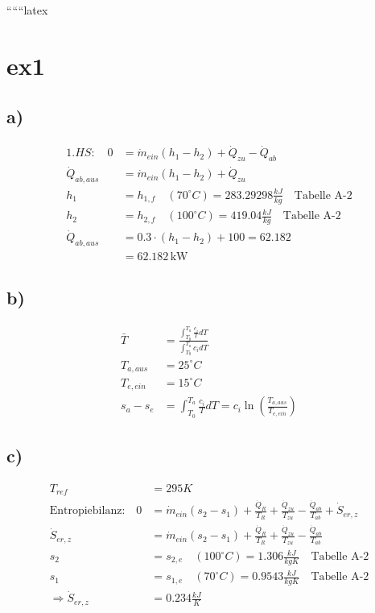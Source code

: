 
``````latex


\section*{ex1}

\subsection*{a)}
\begin{align*}
1. HS: \quad 0 &= \dot{m}_{ein} (h_1 - h_2) + \dot{Q}_{zu} - \dot{Q}_{ab} \\
\dot{Q}_{ab, aus} &= \dot{m}_{ein} (h_1 - h_2) + \dot{Q}_{zu} \\
h_1 &= h_{1,f} \quad (70^\circ C) = 283.29298 \frac{kJ}{kg} \quad \text{Tabelle A-2} \\
h_2 &= h_{2,f} \quad (100^\circ C) = 419.04 \frac{kJ}{kg} \quad \text{Tabelle A-2} \\
\dot{Q}_{ab, aus} &= 0.3 \cdot (h_1 - h_2) + 100 = 62.182 \\
&= \boxed{62.182 \, \text{kW}}
\end{align*}

\subsection*{b)}
\begin{align*}
\bar{T} &= \frac{\int_{T_0}^{T_a} \frac{c_i}{T} dT}{\int_{T_0}^{T_a} c_i dT} \\
T_{a, aus} &= 25^\circ C \\
T_{e, ein} &= 15^\circ C \\
s_{a} - s_{e} &= \int_{T_0}^{T_a} \frac{c_i}{T} dT = c_i \ln \left( \frac{T_{a, aus}}{T_{e, ein}} \right)
\end{align*}

\subsection*{c)}
\begin{align*}
T_{ref} &= 295 K \\
\text{Entropiebilanz:} \quad 0 &= \dot{m}_{ein} (s_2 - s_1) + \frac{\dot{Q}_R}{T_R} + \frac{\dot{Q}_{zu}}{T_{zu}} - \frac{\dot{Q}_{ab}}{T_{ab}} + \dot{S}_{er, z} \\
\dot{S}_{er, z} &= \dot{m}_{ein} (s_2 - s_1) + \frac{\dot{Q}_R}{T_R} + \frac{\dot{Q}_{zu}}{T_{zu}} - \frac{\dot{Q}_{ab}}{T_{ab}} \\
s_2 &= s_{2,e} \quad (100^\circ C) = 1.306 \frac{kJ}{kgK} \quad \text{Tabelle A-2} \\
s_1 &= s_{1,e} \quad (70^\circ C) = 0.9543 \frac{kJ}{kgK} \quad \text{Tabelle A-2} \\
\Rightarrow \dot{S}_{er, z} &= 0.234 \frac{kJ}{K}
\end{align*}

